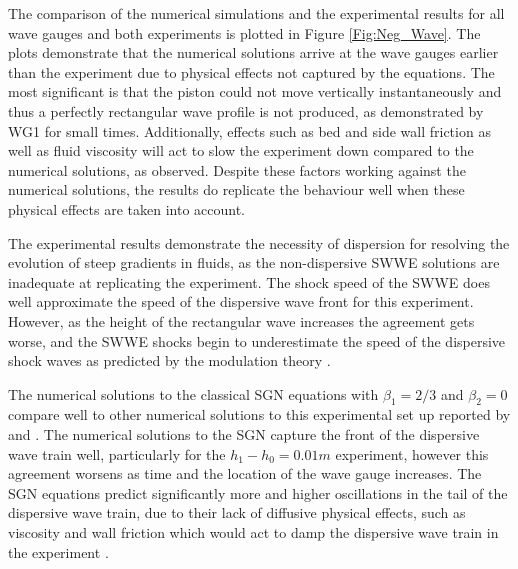 \documentclass[10pt]{elsarticle}
\begin{document}
{The comparison of the numerical simulations and the experimental results for all wave gauges and both experiments is plotted in Figure \ref{Fig:Neg_Wave}. The plots demonstrate that the numerical solutions arrive at the wave gauges earlier than the experiment due to physical effects not captured by the equations. The most significant is that the piston could not move vertically instantaneously and thus a perfectly rectangular wave profile is not produced, as demonstrated by WG1 for small times.  Additionally, effects such as bed and side wall friction as well as fluid viscosity will act to slow the experiment down compared to the numerical solutions, as observed. Despite these factors working against the numerical solutions, the results do replicate the behaviour well when these physical effects are taken into account.

The experimental results demonstrate the necessity of dispersion for resolving the evolution of steep gradients in fluids, as the non-dispersive SWWE solutions are inadequate at replicating the experiment. The shock speed of the SWWE does well approximate the speed of the dispersive wave front for this experiment. However, as the height of the rectangular wave increases the agreement gets worse, and the SWWE shocks begin to underestimate the speed of the dispersive shock waves \cite{Pitt-2018-61} as predicted by the modulation theory \cite{El-etal-2006}. 

The numerical solutions to the classical SGN equations with $\beta_1 = 2/3$ and $\beta_2 = 0$ compare well to other numerical solutions to this experimental set up reported by \citet{Zoppou-etal-2017} and \citet{Pitt-2019}. The numerical solutions to the SGN capture the front of the dispersive wave train well, particularly for the $h_1 - h_0 = 0.01m$ experiment, however this agreement worsens as time and the location of the wave gauge increases. The SGN equations predict significantly more and higher oscillations in the tail of the dispersive wave train, due to their lack of diffusive physical effects, such as viscosity and wall friction which would act to damp the dispersive wave train in the experiment \cite{Pitt-2018-61}. 

}
\end{document}
